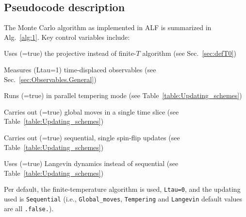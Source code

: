 \subsection{Pseudocode description}\label{sec:pseudocode}

The Monte Carlo algorithm as implemented in ALF is summarized in Alg.~\ref{alg:1}. Key control variables include:
\begin{description}[leftmargin=!,align=right,noitemsep,labelwidth=\widthof{\bfseries Global\_moves},font=\texttt] %
	\item[Projector]     Uses (=true) the projective instead of finite-$T$ algorithm (see Sec.~\ref{sec:defT0})
	\item[$L_{\tau}$]    Measures (Ltau=1) time-displaced observables (see Sec.~\ref{sec:Observables.General})
	\item[Tempering]     Runs (=true) in parallel tempering mode (see Table~\ref{table:Updating_schemes})
	\item[Global\_moves] Carries out (=true) global moves in a single time slice (see Table~\ref{table:Updating_schemes}) 
	\item[Sequential]    Carries out (=true) sequential, single spin-flip updates (see Table~\ref{table:Updating_schemes})
	\item[Langevin]      Uses (=true) Langevin dynamics instead of sequential (see Table~\ref{table:Updating_schemes})
\end{description}
Per default, the finite-temperature algorithm is used, \texttt{Ltau=0}, and the updating used is \texttt{Sequential} (i.e., \texttt{Global\_moves}, \texttt{Tempering} and \texttt{Langevin} default values are all \texttt{.false.}).

